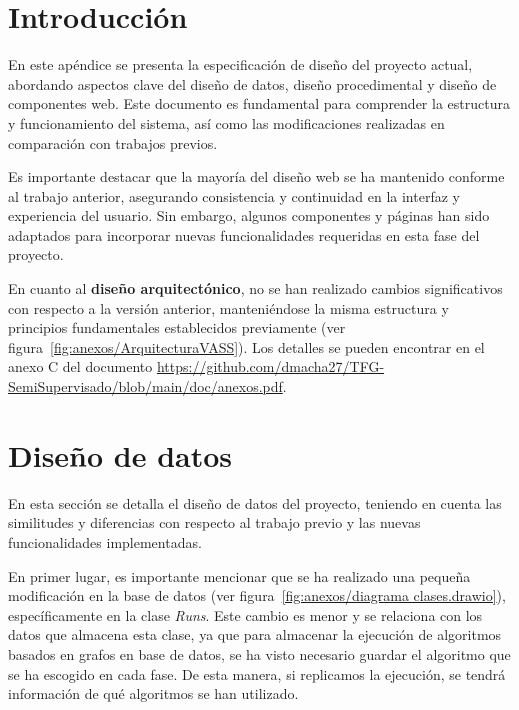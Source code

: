 
\section{Introducción}
En este apéndice se presenta la especificación de diseño del proyecto actual, abordando aspectos clave del diseño de datos, diseño procedimental y diseño de componentes web. Este documento es fundamental para comprender la estructura y funcionamiento del sistema, así como las modificaciones realizadas en comparación con trabajos previos.

Es importante destacar que la mayoría del diseño web se ha mantenido conforme al trabajo anterior, asegurando consistencia y continuidad en la interfaz y experiencia del usuario. Sin embargo, algunos componentes y páginas han sido adaptados para incorporar nuevas funcionalidades requeridas en esta fase del proyecto.

En cuanto al \textbf{diseño arquitectónico}, no se han realizado cambios significativos con respecto a la versión anterior, manteniéndose la misma estructura y principios fundamentales establecidos previamente (ver figura~\ref{fig:anexos/ArquitecturaVASS}). Los detalles se pueden encontrar en el anexo C del documento \url{https://github.com/dmacha27/TFG-SemiSupervisado/blob/main/doc/anexos.pdf}.

\section{Diseño de datos}
En esta sección se detalla el diseño de datos del proyecto, teniendo en cuenta las similitudes y diferencias con respecto al trabajo previo y las nuevas funcionalidades implementadas.

En primer lugar, es importante mencionar que se ha realizado una pequeña modificación en la base de datos (ver figura~\ref{fig:anexos/diagrama clases.drawio}), específicamente en la clase \textit{Runs}. Este cambio es menor y se relaciona con los datos que almacena esta clase, ya que para almacenar la ejecución de algoritmos basados en grafos en base de datos, se ha visto necesario guardar el algoritmo que se ha escogido en cada fase. De esta manera, si replicamos la ejecución, se tendrá información de qué algoritmos se han utilizado.


